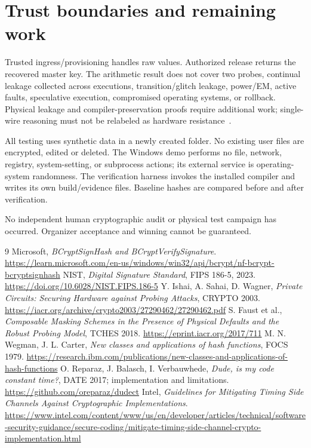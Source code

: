\documentclass[11pt]{article}
\begin{document}
\section{Trust boundaries and remaining work}
Trusted ingress/provisioning handles raw values. Authorized release returns
the recovered master key. The arithmetic result does not cover two probes,
continual leakage collected across executions, transition/glitch leakage,
power/EM, active faults, speculative execution, compromised operating systems,
or rollback. Physical leakage and compiler-preservation proofs require
additional work; single-wire reasoning must not be relabeled as hardware
resistance~\cite{intel,robust}.

All testing uses synthetic data in a newly created folder. No existing user
files are encrypted, edited or deleted. The Windows demo performs no file,
network, registry, system-setting, or subprocess actions; its external service
is operating-system randomness. The verification harness invokes the installed
compiler and writes its own build/evidence files. Baseline hashes are compared
before and after verification.

No independent human cryptographic audit or physical test campaign has occurred.
Organizer acceptance and winning cannot be guaranteed.

\begin{thebibliography}{9}
Microsoft, \emph{BCryptSignHash and BCryptVerifySignature}.
\url{https://learn.microsoft.com/en-us/windows/win32/api/bcrypt/nf-bcrypt-bcryptsignhash}
NIST, \emph{Digital Signature Standard}, FIPS 186-5, 2023.
\url{https://doi.org/10.6028/NIST.FIPS.186-5}
Y. Ishai, A. Sahai, D. Wagner,
\emph{Private Circuits: Securing Hardware against Probing Attacks}, CRYPTO 2003.
\url{https://iacr.org/archive/crypto2003/27290462/27290462.pdf}
S. Faust et al.,
\emph{Composable Masking Schemes in the Presence of Physical Defaults and the
Robust Probing Model}, TCHES 2018.
\url{https://eprint.iacr.org/2017/711}
M. N. Wegman, J. L. Carter,
\emph{New classes and applications of hash functions}, FOCS 1979.
\url{https://research.ibm.com/publications/new-classes-and-applications-of-hash-functions}
O. Reparaz, J. Balasch, I. Verbauwhede,
\emph{Dude, is my code constant time?}, DATE 2017; implementation and limitations.
\url{https://github.com/oreparaz/dudect}
Intel, \emph{Guidelines for Mitigating Timing Side Channels Against
Cryptographic Implementations}.
\url{https://www.intel.com/content/www/us/en/developer/articles/technical/software-security-guidance/secure-coding/mitigate-timing-side-channel-crypto-implementation.html}
\end{thebibliography}
\end{document}
